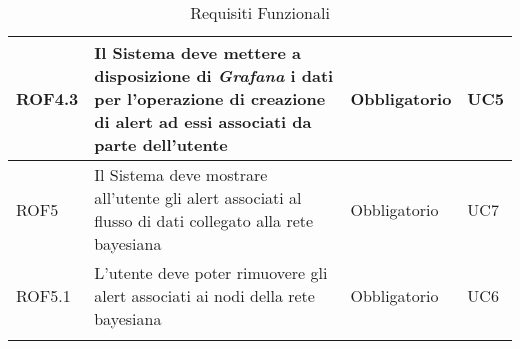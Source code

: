 \begin{center}
\begin{longtable}[c]{|m{}|m{}|m{}|m{}|}
\hline
ROF4.3 & Il Sistema deve mettere a disposizione di \textit{Grafana} i dati per l'operazione di creazione di alert ad essi associati da parte dell'utente & Obbligatorio & UC5\\
\hline
\rowcolor{grigio}ROF5 & Il Sistema deve mostrare all'utente gli alert associati al flusso di dati collegato alla rete bayesiana & Obbligatorio & UC7\\ 
\hline
ROF5.1 & L'utente deve poter rimuovere gli alert associati ai nodi della rete bayesiana & Obbligatorio & UC6\\ 
\hline
\caption{Requisiti Funzionali}
\end{longtable}
\end{center}



